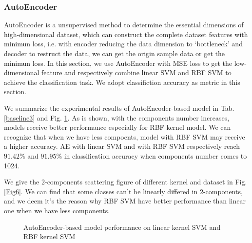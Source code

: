 \documentclass{article}
\begin{document}
\subsubsection{AutoEncoder}
AutoEncoder is a unsupervised method to determine the essential dimensions of high-dimensional dataset, which can construct the complete dataset features with minimun loss, i.e. with encoder reducing the data dimension to `bottleneck' and decoder to restruct the data, we can get the origin sample data or get the minimun loss. In this section, we use AutoEncoder with MSE loss to get the low-dimensional feature and respectively combine linear SVM and RBF SVM to achieve the classification task. We adopt classifiction accuracy as metric in this section.

We summarize the experimental results of AutoEncoder-based model in Tab. \ref{baseline3} and Fig. \ref{Fig5}. As is shown, with the components number increases, models receive better performance especially for RBF kernel model. We can recognize that when we have less compoents, model with RBF SVM may receive a higher accuracy. AE with linear SVM and with RBF SVM respectively reach $91.42\%$ and $91.95\%$ in classification accuracy when components number comes to 1024.

We give the 2-components scattering figure of different kernel and dataset in Fig. \ref{Fig6}. We can find that some classes can't be linearly differed in 2-components, and we deem it's the reason why RBF SVM have better performance than linear one when we have less components.
\begin{center}
	\begin{figure}[htbp]
	\centering
	\quad
	\caption{AutoEncoder-based model performance on linear kernel SVM and RBF kernel SVM}
	\label{Fig5}
	\end{figure}
	\end{center}
	
\end{document}
